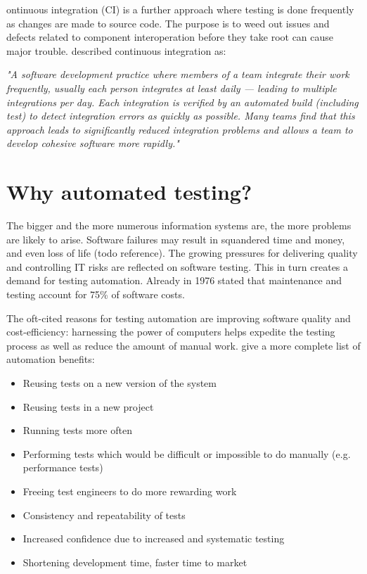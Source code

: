 \documentclass[12pt,a4paper,oneside,pdftex]{report}
\begin{document}
ontinuous integration (CI) is a further approach where testing is done frequently as changes are made to source code. The purpose is to weed out issues and defects related to component interoperation before they take root can cause major trouble. \citet{duvall2007continuous} described continuous integration as:

\begin{adjustwidth}{2.5em}{0pt}
\small
\emph{"A software development practice where members of a team integrate their work frequently, usually each person integrates at least daily --- leading to multiple integrations per day. Each integration is verified by an automated build (including test) to detect integration errors as quickly as possible. Many teams find that this approach leads to significantly reduced integration problems and allows a team to develop cohesive software more rapidly."}
\normal
\end{adjustwidth}


\section{Why automated testing?}


The bigger and the more numerous information systems are, the more problems are likely to arise. Software failures may result in squandered time and money, and even loss of life (todo reference). The growing pressures for delivering quality and controlling IT risks are reflected on software testing. This in turn creates a demand for testing automation. Already in 1976 \citet{myers1976software} stated that maintenance and testing account for 75\% of software costs.

The oft-cited reasons for testing automation are improving software quality and cost-efficiency: harnessing the power of computers helps expedite the testing process as well as reduce the amount of manual work. \citet{fewster1999software} give a more complete list of automation benefits: %

\begin{itemize}
\item Reusing tests on a new version of the system
\item Reusing tests in a new project
\item Running tests more often
\item Performing tests which would be difficult or impossible to do manually (e.g. performance tests)
\item Freeing test engineers to do more rewarding work
\item Consistency and repeatability of tests
\item Increased confidence due to increased and systematic testing
\item Shortening development time, faster time to market
\end{itemize}
\end{document}
